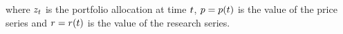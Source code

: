 \documentclass{article}
\begin{document}
\hspace{200mm}

\noindent where $z_t$ is the portfolio allocation at time $t$, $p = p(t)$ is the value of the price series and $r = r(t)$ is the value of the research series.

\hspace{200mm}
\hspace{200mm}

\keyterms
\furtherlinks
\end{document}
